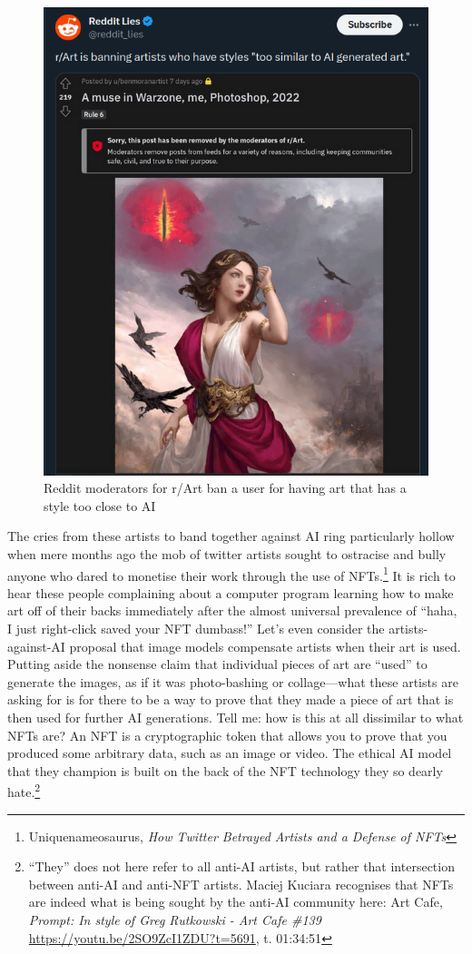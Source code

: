 \documentclass[11pt]{article}
\begin{document}
\begin{figure}[htbp]
\centering
\includegraphics[width=.9\linewidth]{./images/reddit ban artist.png}
\caption{Reddit moderators for r/Art ban a user for having art that has a style too close to AI}
\end{figure}

The cries from these artists to band together against AI ring particularly hollow when mere months ago the mob of twitter artists sought to ostracise and bully anyone who dared to monetise their work through the use of NFTs.\footnote{Uniquenameosaurus, \emph{How Twitter Betrayed Artists and a Defense of NFTs}} It is rich to hear these people complaining about a computer program learning how to make art off of their backs immediately after the almost universal prevalence of ``haha, I just right-click saved your NFT dumbass!'' Let's even consider the artists-against-AI proposal that image models compensate artists when their art is used. Putting aside the nonsense claim that individual pieces of art are ``used'' to generate the images, as if it was photo-bashing or collage---what these artists are asking for is for there to be a way to prove that they made a piece of art that is then used for further AI generations. Tell me: how is this at all dissimilar to what NFTs are? An NFT is a cryptographic token that allows you to prove that you produced some arbitrary data, such as an image or video. The ethical AI model that they champion is built on the back of the NFT technology they so dearly hate.\footnote{``They'' does not here refer to all anti-AI artists, but rather that intersection between anti-AI and anti-NFT artists. Maciej Kuciara recognises that NFTs are indeed what is being sought by the anti-AI community here: Art Cafe, \emph{Prompt: In style of Greg Rutkowski - Art Cafe \#139} \url{https://youtu.be/2SO9ZcI1ZDU?t=5691}, t. 01:34:51}
\end{document}

